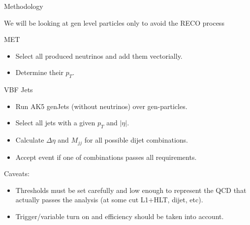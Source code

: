\documentclass[8pt]{beamer}
\begin{document}
\begin{frame}{Methodology}

We will be looking at gen level particles only to avoid the RECO process

\begin{block}{MET}

  \begin{itemize}
    \item Select all produced neutrinos and add them vectorially.
    \item Determine their $p_T$.
  \end{itemize}

\end{block}

\begin{block}{VBF Jets}

  \begin{itemize}
    \item Run AK5 genJets (without neutrinos) over gen-particles.
    \item Select all jets with a given $p_T$ and $|\eta|$.
    \item Calculate $\Delta\eta$ and $M_{jj}$ for all possible dijet combinations.
    \item Accept event if one of combinations passes all requirements.
  \end{itemize}

\end{block}

\begin{block}{Caveats:}
 
  \begin{itemize}
    \item Thresholds must be set carefully and low enough to represent the QCD that actually passes the
          analysis (at some cut L1+HLT, dijet, etc).
    \item Trigger/variable turn on and efficiency should be taken into account.
  \end{itemize}

\end{block}

\end{frame}
\end{document}
